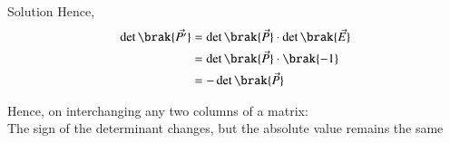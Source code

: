 \documentclass{beamer}
\begin{document}
\begin{frame}{Solution}
Hence,
\begin{align}
\det\brak{\vec{P'}} 
&= \det\brak{\vec{P}} \cdot \det\brak{\vec{E}} \\
&= \det\brak{\vec{P}} \cdot \brak{-1} \\
&= -\det\brak{\vec{P}}
\end{align}

Hence, on interchanging any two columns of a matrix:\\
The sign of the determinant changes, but the absolute value remains the same
\end{frame}
\end{document}
